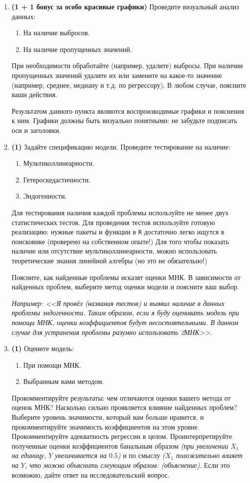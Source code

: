 \documentclass[10pt, a4paper]{extarticle}
\newcommand{\code}[1]{{\tt #1}}
\begin{document}
\begin{enumerate}
	\item \textbf{(1 + 1 бонус за особо красивые графики)} Проведите визуальный анализ данных:
	\begin{enumerate}
		\item На наличие выбросов.
		\item На наличие пропущенных значений.
	\end{enumerate}
	
	При необходимости обработайте (например, удалите) выбросы. При наличии пропущенных значений удалите их или замените на какое-то значение (например, среднее, медиану и т.д. по регрессору). В любом случае, поясните ваши действия.
	
	Результатом данного пункта являются воспроизводимые графики и пояснения к ним. Графики должны быть визуально понятными: не забудьте подписать оси и заголовки. 
	
	\item \textbf{(1)} Задайте спецификацию модели. Проведите тестирование на наличие:
	\begin{enumerate}
		\item Мультиколлинеарности.
		\item Гетероскедастичности.
		\item Эндогенности.
	\end{enumerate}
	Для тестирования наличия каждой проблемы используйте не менее двух статистических тестов. Для проведения тестов используйте готовую реализацию: нужные пакеты и функции в \code{R} достаточно легко ищутся в поисковике (проверено на собственном опыте!) Для того чтобы показать наличие или отсутствие мультиколлинеарности, можно использовать теоретические знания линейной алгебры (но это не обязательно!)
	
	Поясните, как найденные проблемы исказят оценки МНК. В зависимости от найденных проблем, выберите метод оценки модели и поясните ваш выбор.
	
	\textit{Например: <<Я провёл (названия тестов) и выявил наличие в данных проблемы эндогенности. Таким образом, если я буду оценивать модель при помощи МНК, оценки коэффициентов будут несостоятельными. В данном случае для устранения проблемы разумно использовать 2МНК>>.}
	
	\item \textbf{(1)} Оцените модель:
	\begin{enumerate}
		\item При помощи МНК.
		\item Выбранным вами методом.
	\end{enumerate}
	Прокомментируйте результаты: чем отличаются оценки вашего метода от оценок МНК? Насколько сильно проявляется влияние найденных проблем? Выберите уровень значимости, который вам больше нравится, и прокомментируйте значимость коэффициентов на этом уровне. Прокомментируйте адекватность регрессии в целом. Проинтерпретируйте полученные оценки коэффициентов банальным образом \textit{(при увеличении $X_1$ на единицу, $Y$ увеличивается на $0.5$)} и по смыслу \textit{($X_1$ положительно влияет на $Y$, что можно объяснить слеующим образом: (объяснение)}. Если это возможно, дайте ответ на исследовательский вопрос.
	

\end{enumerate}
\end{document}
